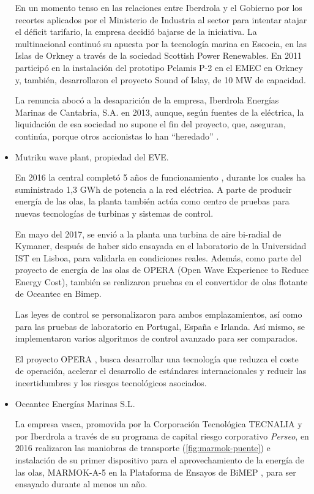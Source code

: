 \begin{itemize}
  En un momento tenso en las relaciones entre Iberdrola y el Gobierno
  por los recortes aplicados por el Ministerio de Industria al sector
  para intentar atajar el déficit tarifario, la empresa decidió bajarse
  de la iniciativa. La multinacional continuó su apuesta por la
  tecnología marina en Escocia, en las Islas de Orkney a través de la
  sociedad Scottish Power Renewables. En 2011 participó en la
  instalación del prototipo Pelamis P-2 en el EMEC en Orkney y, también,
  desarrollaron el proyecto Sound of Islay, de 10 MW de capacidad.

  La renuncia abocó a la desaparición de la empresa, Iberdrola Energías
  Marinas de Cantabria, S.A. en 2013, aunque, según fuentes de la
  eléctrica, la liquidación de esa sociedad no supone el fin del
  proyecto, que, aseguran, continúa, porque otros accionistas lo han
  ``heredado'' \cite{iberdrola13}.
  
\item
  Mutriku wave plant, propiedad del EVE.

  En 2016 la central completó 5 años de funcionamiento \cite{mutriku16}, durante los cuales ha suministrado 1,3 GWh de
  potencia a la red eléctrica. A parte de producir energía de las olas,
  la planta también actúa como centro de pruebas para nuevas tecnologías
  de turbinas y sistemas de control.

  En mayo del 2017, se envió a la planta una turbina de aire bi-radial
  de Kymaner, después de haber sido ensayada en el laboratorio de la
  Universidad IST en Lisboa, para validarla en condiciones reales.
  Además, como parte del proyecto de energía de las olas de OPERA (Open
  Wave Experience to Reduce Energy Cost), también se realizaron pruebas
  en el convertidor de olas flotante de Oceantec en Bimep.

  Las leyes de control se personalizaron para ambos emplazamientos, así
  como para las pruebas de laboratorio en Portugal, España e Irlanda.
  Así mismo, se implementaron varios algoritmos de control avanzado para
  ser comparados.

  El proyecto OPERA \cite{opera17}, busca desarrollar una tecnología que reduzca el
  coste de operación, acelerar el desarrollo de estándares
  internacionales y reducir las incertidumbres y los riesgos
  tecnológicos asociados.
  
\item
  Oceantec Energías Marinas S.L.

  La empresa vasca, promovida por la Corporación Tecnológica TECNALIA y
  por Iberdrola a través de su programa de capital riesgo corporativo
  \emph{Perseo}, en 2016 realizaron las maniobras de transporte (\autoref{fig:marmok-puente}) e
  instalación de su primer dispositivo para el aprovechamiento de la
  energía de las olas, MARMOK-A-5 en la Plataforma de Ensayos de BiMEP \cite{bimep}, para ser
  ensayado durante al menos un año.




\end{itemize}
